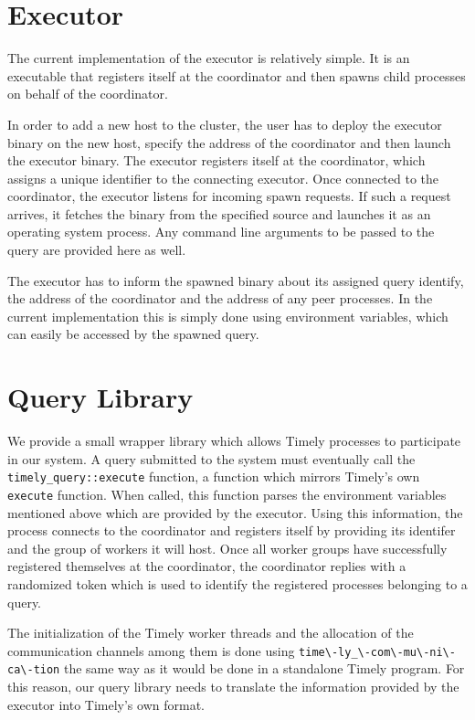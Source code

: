 \section{Executor}

The current implementation of the executor is relatively simple. It is an executable
that registers itself at the coordinator and then spawns child processes on behalf
of the coordinator.

In order to add a new host to the cluster, the user has to deploy the executor
binary on the new host, specify the address of the coordinator and then launch
the executor binary. The executor registers itself at the coordinator, which
assigns a unique identifier to the connecting executor. Once connected to the
coordinator, the executor listens for incoming spawn requests. If such a
request arrives, it fetches the binary from the specified source and launches
it as an operating system process. Any command line arguments to be passed
to the query are provided here as well.

The executor has to inform the spawned binary about its assigned query identify,
the address of the coordinator and the address of any peer processes. In the
current implementation this is simply done using environment variables, which
can easily be accessed by the spawned query.


\section{Query Library}

We provide a small wrapper library which allows Timely processes to participate
in our system. A query submitted to the system must eventually call the 
\lstinline{timely_query::execute} function, a function which mirrors Timely's
own \lstinline{execute} function. When called, this function parses the
environment variables mentioned above which are provided by the executor.
Using this information, the process connects to the coordinator and registers
itself by providing its identifer and the group of workers it will host. Once
all worker groups have successfully registered themselves at the coordinator,
the coordinator replies with a randomized token which is used to identify
the registered processes belonging to a query. 

The initialization of the Timely worker threads and the allocation of the
communication channels among them is done using \lstinline{time\-ly_\-com\-mu\-ni\-ca\-tion}
the same way as it would be done in a standalone Timely program. For this
reason, our query library needs to translate the information provided by the
executor into Timely's own format.


